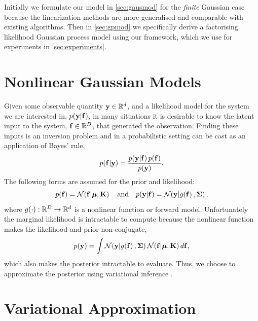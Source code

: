 \documentclass{article} %
\begin{document}
Initially we formulate our model in \autoref{sec:gausmod} for the \emph{finite}
Gaussian case because the linearization methods are more generalised and
comparable with existing algorithms. Then in \autoref{sec:gpmod} we
specifically derive a factorising likelihood Gaussian process model using our
framework, which we use for experiments in \autoref{sec:experiments}.


\section{Nonlinear Gaussian Models}
\label{sec:gausmod}

Given some observable quantity $\mathbf{y} \in \mathbb{R}^{d}$, and a likelihood model for
the system we are interested in, $p\!\left({\mathbf{y}}\middle\vert{\ensuremath{\mathbf{f}}}\right)$, in many situations it
is desirable to know the latent input to the system, $\mathbf{f}\in\mathbb{R}^{D}$, that
generated the observation. Finding these inputs is an inversion problem and in
a probabilistic setting can be cast as an application of Bayes' rule,
\begin{equation}
    p\!\left({\mathbf{f}}\middle\vert{\ensuremath{\mathbf{y}}}\right) = \frac{p\!\left({\mathbf{y}}\middle\vert{\ensuremath{\mathbf{f}}}\right)p\!\left({\mathbf{f}}\right)}
        {p\!\left({\mathbf{y}}\right)}.
    \label{eq:bayesrule}
\end{equation}
The following forms are assumed for the prior and likelihood:
\begin{equation}
    p\!\left({\mathbf{f}}\right) = \mathcal{N}\!\left({\mathbf{f}}\middle\vert{\ensuremath{\boldsymbol{\mu}}, \ensuremath{\mathbf{K}}}\right)
    \quad \text{and} \quad
    p\!\left({\mathbf{y}}\middle\vert{\ensuremath{\mathbf{f}}}\right) = \mathcal{N}\!\left({\mathbf{y}}\middle\vert{\ensuremath{g\!\left({{\mathbf{f}}}\right)}, \ensuremath{\boldsymbol{\Sigma}}}\right),
    \label{eq:priorlike}
\end{equation}
where $g\!\left({{\cdot}}\right) : \mathbb{R}^{D} \to \mathbb{R}^{d}$ is a nonlinear function or
forward model. Unfortunately the marginal likelihood is intractable to compute
because the nonlinear function makes the likelihood and prior non-conjugate,
\begin{equation}
    p\!\left({\mathbf{y}}\right) = \int \mathcal{N}\!\left({\mathbf{y}}\middle\vert{\ensuremath{g\!\left({{\mathbf{f}}}\right)}, \ensuremath{\boldsymbol{\Sigma}}}\right)
        \mathcal{N}\!\left({\mathbf{f}}\middle\vert{\ensuremath{\boldsymbol{\mu}}, \ensuremath{\mathbf{K}}}\right) d\mathbf{f},
    \label{eq:marglike}
\end{equation}
which also makes the posterior intractable to evaluate. Thus, we choose to
approximate the posterior using variational inference \cite{Jordan1999}.


\section{Variational Approximation}
\end{document}
